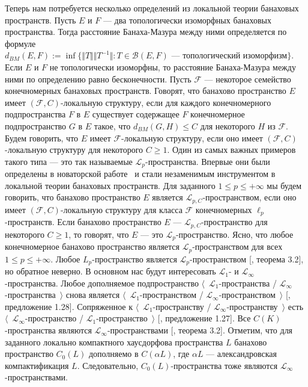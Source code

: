 Теперь нам потребуется несколько определений из локальной теории банаховых
пространств. Пусть $E$ и $F$ --- два топологически изоморфных банаховых
пространства. Тогда расстояние Банаха-Мазура между ними определяется по формуле
$d_{BM}(E,F) :=\inf \{\Vert T\Vert\Vert T^{-1}\Vert : T \in \mathcal{B}(E,F)
\mbox{ --- топологический изоморфизм} \}$. Если $E$ и $F$ не топологически
изоморфны, то расстояние Банаха-Мазура между ними по определению равно
бесконечности. Пусть $\mathcal{F}$ --- некоторое семейство конечномерных
банаховых пространств. Говорят, что банахово пространство $E$ имеет
$(\mathcal{F}, C)$-локальную структуру, если для каждого конечномерного
подпространства $F$ в $E$ существует содержащее $F$ конечномерное
подпространство $G$ в $E$ такое, что $d_{BM}(G,H)\leq C$ для некоторого $H$ из
$\mathcal{F}$. Будем говорить, что $E$ имеет $\mathcal{F}$-локальную структуру,
если оно имеет $(\mathcal{F},C)$-локальную структуру для некоторого $C\geq 1$.
Один из самых важных примеров такого типа --- это так называемые
$\mathscr{L}_p$-пространства. Впервые они были определены в новаторской
работе~\cite{LinPelAbsSumOpInLpSpAndApp} и стали незаменимым инструментом в
локальной теории банаховых пространств. Для заданного $1\leq p\leq +\infty$ мы
будем говорить, что банахово пространство $E$ является
$\mathscr{L}_{p,C}$-пространством, если оно имеет $(\mathcal{F},C)$-локальную
структуру для класса $\mathcal{F}$ конечномерных $\ell_p$-пространств. Если
банахово пространство $E$ --- $\mathscr{L}_{p,C}$-пространство для некоторого
$C\geq 1$, то говорят, что $E$ --- это $\mathscr{L}_p$-пространство. Ясно, что
любое конечномерное банахово пространство является $\mathscr{L}_p$-пространством
для всех $1\leq p\leq +\infty$. Любое $L_p$-пространство является
$\mathscr{L}_p$-пространством  [\cite{DiestAbsSumOps}, теорема 3.2], но обратное
неверно. В основном нас будут интересовать $\mathscr{L}_1$- и
$\mathscr{L}_\infty$-пространства. Любое дополняемое подпространство
$\langle$~$\mathscr{L}_1$-пространства /
$\mathscr{L}_\infty$-пространства~$\rangle$ снова является
$\langle$~$\mathscr{L}_1$-пространством /
$\mathscr{L}_\infty$-пространством~$\rangle$ [\cite{BourgNewClOfLpSp},
предложение 1.28]. Сопряженное к $\langle$~$\mathscr{L}_1$-пространству /
$\mathscr{L}_\infty$-пространству~$\rangle$ есть
$\langle$~$\mathscr{L}_\infty$-пространство /
$\mathscr{L}_1$-пространство~$\rangle$ [\cite{BourgNewClOfLpSp}, предложение
1.27]. Все $C(K)$-пространства являются $\mathscr{L}_\infty$-пространствами
[\cite{DiestAbsSumOps}, теорема 3.2]. Отметим, что для заданного локально
компактного хаусдорфова пространства $L$ банахово пространство $C_0(L)$
дополняемо в $C(\alpha L)$, где $\alpha L$ --- александровская компактификация
$L$. Следовательно, $C_0(L)$-пространства тоже являются
$\mathscr{L}_\infty$-пространствами. 


